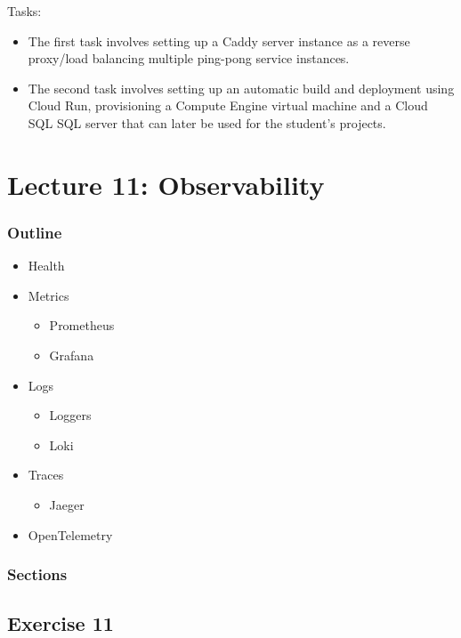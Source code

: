 \documentclass[
  digital,
  color,
  oneside,
  nosansbold,
  nocolorbold,
  lof,
  lot,
]{fithesis4}
\begin{document}
Tasks:
\begin{itemize}
    \item The first task involves setting up a Caddy server instance as a reverse proxy/load balancing multiple ping-pong service instances.
    \item The second task involves setting up an automatic build and deployment using Cloud Run, provisioning a Compute Engine virtual machine and a Cloud SQL SQL server that can later be used for the student's projects.
\end{itemize}
    
\section{Lecture 11: Observability}

\subsubsection{Outline}

\begin{itemize}
    \item Health
    \item Metrics
    \begin{itemize}
        \item Prometheus
        \item Grafana
    \end{itemize}
    \item Logs
    \begin{itemize}
        \item Loggers
        \item Loki
    \end{itemize}
    \item Traces
    \begin{itemize}
        \item Jaeger
    \end{itemize}
    \item OpenTelemetry
\end{itemize}

\subsubsection{Sections}

\subsection{Exercise 11}
\end{document}
